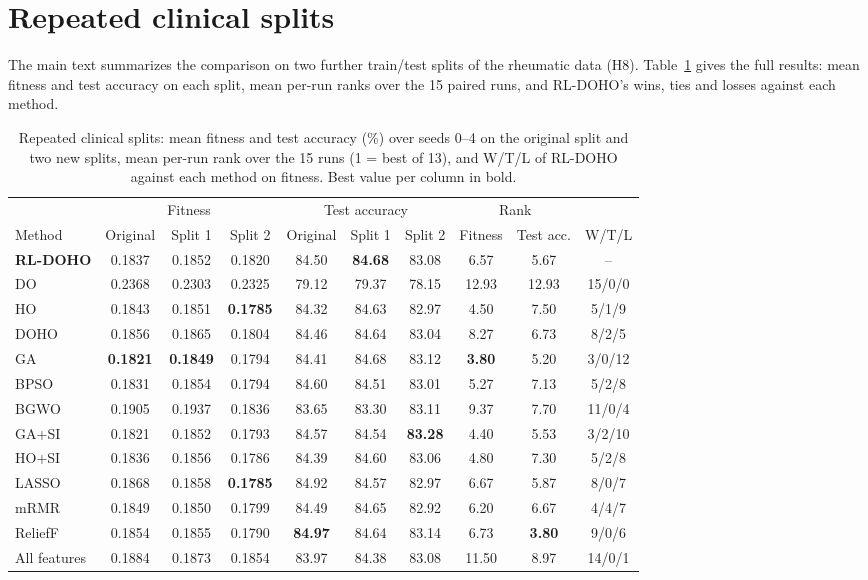 \documentclass[journal]{IEEEtran}
\begin{document}
\section{Repeated clinical splits}
The main text summarizes the comparison on two further train/test splits of the rheumatic data (H8). Table~\ref{tab:splits} gives the full results: mean fitness and test accuracy on each split, mean per-run ranks over the 15 paired runs, and RL-DOHO's wins, ties and losses against each method.

\begin{table}[h]
\centering
\caption{Repeated clinical splits: mean fitness and test accuracy (\%) over seeds 0--4 on the original split and two new splits, mean per-run rank over the 15 runs (1 = best of 13), and W/T/L of RL-DOHO against each method on fitness. Best value per column in bold.}
\label{tab:splits}
\footnotesize
\setlength{\tabcolsep}{4pt}
\begin{tabular}{@{}lccccccccc@{}}
\toprule
& \multicolumn{3}{c}{Fitness} & \multicolumn{3}{c}{Test accuracy} & \multicolumn{2}{c}{Rank} & \\
\cmidrule(lr){2-4}\cmidrule(lr){5-7}\cmidrule(lr){8-9}
Method & Original & Split 1 & Split 2 & Original & Split 1 & Split 2 & Fitness & Test acc. & W/T/L \\
\midrule
\textbf{RL-DOHO} & 0.1837 & 0.1852 & 0.1820 & 84.50 & \textbf{84.68} & 83.08 & 6.57 & 5.67 & -- \\
DO & 0.2368 & 0.2303 & 0.2325 & 79.12 & 79.37 & 78.15 & 12.93 & 12.93 & 15/0/0 \\
HO & 0.1843 & 0.1851 & \textbf{0.1785} & 84.32 & 84.63 & 82.97 & 4.50 & 7.50 & 5/1/9 \\
DOHO & 0.1856 & 0.1865 & 0.1804 & 84.46 & 84.64 & 83.04 & 8.27 & 6.73 & 8/2/5 \\
\midrule
GA & \textbf{0.1821} & \textbf{0.1849} & 0.1794 & 84.41 & 84.68 & 83.12 & \textbf{3.80} & 5.20 & 3/0/12 \\
BPSO & 0.1831 & 0.1854 & 0.1794 & 84.60 & 84.51 & 83.01 & 5.27 & 7.13 & 5/2/8 \\
BGWO & 0.1905 & 0.1937 & 0.1836 & 83.65 & 83.30 & 83.11 & 9.37 & 7.70 & 11/0/4 \\
\midrule
GA+SI & 0.1821 & 0.1852 & 0.1793 & 84.57 & 84.54 & \textbf{83.28} & 4.40 & 5.53 & 3/2/10 \\
HO+SI & 0.1836 & 0.1856 & 0.1786 & 84.39 & 84.60 & 83.06 & 4.80 & 7.30 & 5/2/8 \\
\midrule
LASSO & 0.1868 & 0.1858 & \textbf{0.1785} & 84.92 & 84.57 & 82.97 & 6.67 & 5.87 & 8/0/7 \\
mRMR & 0.1849 & 0.1850 & 0.1799 & 84.49 & 84.65 & 82.92 & 6.20 & 6.67 & 4/4/7 \\
ReliefF & 0.1854 & 0.1855 & 0.1790 & \textbf{84.97} & 84.64 & 83.14 & 6.73 & \textbf{3.80} & 9/0/6 \\
All features & 0.1884 & 0.1873 & 0.1854 & 83.97 & 84.38 & 83.08 & 11.50 & 8.97 & 14/0/1 \\
\bottomrule
\end{tabular}
\end{table}
\end{document}
